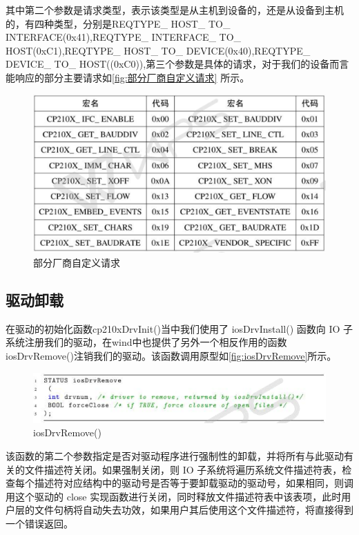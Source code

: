 其中第二个参数是请求类型，表示该类型是从主机到设备的，还是从设备到主机的，有四种类型，分别是REQTYPE\_ HOST\_ TO\_ INTERFACE(0x41),REQTYPE\_ INTERFACE\_ TO\_ HOST(0xC1),REQTYPE\_ HOST\_ TO\_ DEVICE(0x40),REQTYPE\_ DEVICE\_ TO\_ HOST((0xC0)),第三个参数是具体的请求，对于我们的设备而言能响应的部分主要请求如\autoref{fig:部分厂商自定义请求} 所示。

\begin{figure}[!h]
\centering
\includegraphics[width=1.0\textwidth]{./graphics/vendorSpecify.pdf}
\caption{部分厂商自定义请求}\label{fig:部分厂商自定义请求}
\end{figure}


\subsection{驱动卸载}
	在驱动的初始化函数cp210xDrvInit()当中我们使用了 iosDrvInstall() 函数向 IO 子系统注册我们的驱动，在wind中也提供了另外一个相反作用的函数iosDrvRemove()注销我们的驱动。该函数调用原型如\autoref{fig:iosDrvRemove}所示。
	
\begin{figure}[!h]
\centering
\includegraphics[width=1.0\textwidth]{./graphics/iosDrvRemove.pdf}
\caption{iosDrvRemove()}\label{fig:iosDrvRemove}
\end{figure}

该函数的第二个参数指定是否对驱动程序进行强制性的卸载，并将所有与此驱动有关的文件描述符关闭。如果强制关闭，则 IO 子系统将遍历系统文件描述符表，检查每个描述符对应结构中的驱动号是否等于要卸载驱动的驱动号，如果相同，则调用这个驱动的 close 实现函数进行关闭，同时释放文件描述符表中该表项，此时用户层的文件句柄将自动失去功效，如果用户其后使用这个文件描述符，将直接得到一个错误返回。


